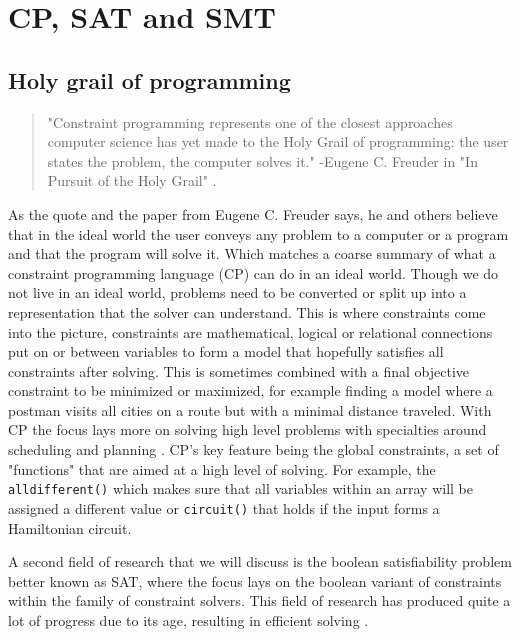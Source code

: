 \chapter{CP, SAT and SMT}
\label{cha:2:CS}
\label{CS:Intro}
\label{CS:HolyGrail}
\section{Holy grail of programming}
\begin{quote}
	"Constraint programming represents one of the closest approaches computer science has yet made to the Holy Grail of programming: the user states the problem, the computer solves it." 
	\newline
	-Eugene C. Freuder in "In Pursuit of the Holy Grail" \cite{11freuder1997pursuitHolyGrail}.
\end{quote}
As the quote and the paper \cite{11freuder1997pursuitHolyGrail} from Eugene C. Freuder says, he and others believe that in the ideal world the user conveys any problem to a computer or a program and that the program will solve it. Which matches a coarse summary of what a constraint programming language (CP) can do in an ideal world. Though we do not live in an ideal world, problems need to be converted or split up into a representation that the solver can understand. 
This is where constraints come into the picture, constraints are mathematical, logical or relational connections put on or between variables to form a model that hopefully satisfies all constraints after solving. This is sometimes combined with a final objective constraint to be minimized or maximized, for example finding a model where a postman visits all cities on a route but with a minimal distance traveled. 
With CP the focus lays more on solving high level problems with specialties around scheduling and planning \cite{52bartak1999constraint}. CP's key feature being the global constraints, a set of "functions" that are aimed at a high level of solving. For example, the \texttt{alldifferent()} which makes sure that all variables within an array will be assigned a different value or \texttt{circuit()} that holds if the input forms a Hamiltonian circuit.

A second field of research that we will discuss is the boolean satisfiability problem better known as SAT, where the focus lays on the boolean variant of constraints within the family of constraint solvers. This field of research has produced quite a lot of progress due to its age, resulting in efficient solving \cite{56bardin2019bringing}.

